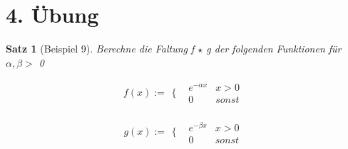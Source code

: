 \documentclass[a4paper,11pt]{article}
\newtheorem{satz}{Satz}
\numberwithin{satz}{subsection}
\begin{document}
 \large

\section{4. Übung}

\begin{satz}[Beispiel 9]
	Berechne die Faltung f $\star$ g der folgenden Funktionen für $\alpha, \beta >$ 0
	
	\begin{equation*}
	f(x) := \begin{array}{cc}
		\Bigg\{ & \begin{array}{cc}
		 e^{-\alpha x} & x > 0  \\
		 0 & sonst
		\end{array}
	\end{array}
	\end{equation*}
	
	\begin{equation*}
	g(x) := \begin{array}{cc}
	\Bigg\{ & \begin{array}{cc}
	e^{-\beta x} & x > 0  \\
	0 & sonst
	\end{array}
	\end{array}
	\end{equation*}
	
\end{satz}
\end{document}
